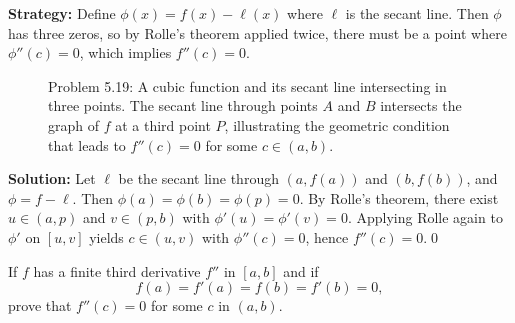 \noindent\textbf{Strategy:} Define \( \phi(x) = f(x) - \ell(x) \) where \( \ell \) is the secant line. Then \( \phi \) has three zeros, so by Rolle's theorem applied twice, there must be a point where \( \phi''(c) = 0 \), which implies \( f''(c) = 0 \).

\begin{figure}[h]
\centering
{}
\caption{Problem 5.19: A cubic function and its secant line intersecting in three points. The secant line through points $A$ and $B$ intersects the graph of $f$ at a third point $P$, illustrating the geometric condition that leads to $f''(c) = 0$ for some $c \in (a,b)$.}
\end{figure}

\bigskip\noindent\textbf{Solution:}
Let $\ell$ be the secant line through $(a,f(a))$ and $(b,f(b))$, and $\phi=f-\ell$. Then $\phi(a)=\phi(b)=\phi(p)=0$. By Rolle's theorem, there exist $u\in(a,p)$ and $v\in(p,b)$ with $\phi'(u)=\phi'(v)=0$. Applying Rolle again to $\phi'$ on $[u,v]$ yields $c\in(u,v)$ with $\phi''(c)=0$, hence $f''(c)=0$.\qed


\begin{problembox}
\begin{problemstatement}
If \( f \) has a finite third derivative \( f'' \) in \( [a, b] \) and if
\[ f(a) = f'(a) = f(b) = f'(b) = 0, \]
prove that \( f''(c) = 0 \) for some \( c \) in \( (a, b) \).
\end{problemstatement}
\end{problembox}

